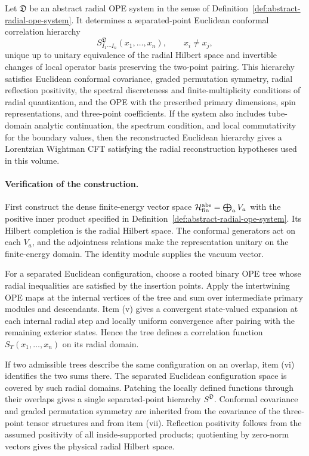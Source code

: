 \begin{construction}
\label{cons:conditional-cft-reconstruction-from-ope}
Let \(\mathfrak D\) be an abstract radial OPE system in the sense of
Definition~\ref{def:abstract-radial-ope-system}.  It determines a
separated-point Euclidean conformal correlation hierarchy
\[
  S_{I_1\cdots I_n}^{\mathfrak D}(x_1,\ldots,x_n),
  \qquad x_i\ne x_j,
\]
unique up to unitary equivalence of the radial Hilbert space and invertible
changes of local operator basis preserving the two-point pairing.  This
hierarchy satisfies Euclidean conformal covariance, graded permutation
symmetry, radial reflection positivity, the spectral discreteness and
finite-multiplicity conditions of radial quantization, and the OPE with the
prescribed primary dimensions, spin representations, and three-point
coefficients.  If the system also includes tube-domain analytic continuation,
the spectrum condition, and local commutativity for the boundary values, then
the reconstructed Euclidean hierarchy gives a Lorentzian Wightman CFT
satisfying the radial reconstruction hypotheses used in this volume.
\end{construction}

\paragraph{Verification of the construction.}
First construct the dense finite-energy vector space
\(\mathcal H_{\rm fin}^{\rm abs}=\bigoplus_a V_a\) with the positive inner
product specified in Definition~\ref{def:abstract-radial-ope-system}.  Its
Hilbert completion is the radial Hilbert space.  The conformal generators act
on each \(V_a\), and the adjointness relations make the representation
unitary on the finite-energy domain.  The identity module supplies the vacuum
vector.

For a separated Euclidean configuration, choose a rooted binary OPE tree whose
radial inequalities are satisfied by the insertion points.  Apply the
intertwining OPE maps at the internal vertices of the tree and sum over
intermediate primary modules and descendants.  Item (v) gives a convergent
state-valued expansion at each internal radial step and locally uniform
convergence after pairing with the remaining exterior states.  Hence the tree
defines a correlation function \(S_T(x_1,\ldots,x_n)\) on its radial domain.

If two admissible trees describe the same configuration on an overlap, item
(vi) identifies the two sums there.  The separated Euclidean configuration
space is covered by such radial domains.  Patching the locally defined
functions through their overlaps gives a single separated-point hierarchy
\(S^{\mathfrak D}\).  Conformal covariance and graded permutation symmetry
are inherited from the covariance of the three-point tensor structures and
from item (vii).  Reflection positivity follows from the assumed positivity of
all inside-supported products; quotienting by zero-norm vectors gives the
physical radial Hilbert space.

